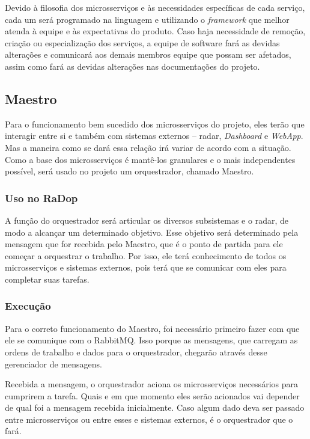 Devido à filosofia dos microsserviços e às necessidades específicas de cada serviço, cada um será programado na linguagem e utilizando o \textit{framework} que melhor atenda à equipe e às expectativas do produto.
Caso haja necessidade de remoção, criação ou especialização dos serviços, a equipe de software fará as devidas alterações e comunicará aos demais membros equipe que possam ser afetados, assim como fará as devidas alterações nas documentações do projeto.

\subsection{Maestro}
Para o funcionamento bem sucedido dos microsserviços do projeto, eles terão que interagir entre si e também com sistemas externos -- radar, \textit{Dashboard} e \textit{WebApp}. Mas a maneira como se dará essa relação irá variar de acordo com a situação. Como a base dos microsserviços é mantê-los granulares e o mais independentes possível, será usado no projeto um orquestrador, chamado Maestro.

\subsubsection{Uso no RaDop}
A função do orquestrador será articular os diversos subsistemas e o radar, de modo a alcançar um determinado objetivo. Esse objetivo será determinado pela mensagem que for recebida pelo Maestro, que é o ponto de partida para ele começar a orquestrar o trabalho. Por isso, ele terá conhecimento de todos os microsserviços e sistemas externos, pois terá que se comunicar com eles para completar suas tarefas.

\subsubsection{Execução}
Para o correto funcionamento do Maestro, foi necessário primeiro fazer com que ele se comunique com o RabbitMQ. Isso porque as mensagens, que carregam as ordens de trabalho e dados para o orquestrador, chegarão através desse gerenciador de mensagens.

Recebida a mensagem, o orquestrador aciona os microsserviços necessários para cumprirem a tarefa. Quais e em que momento eles serão acionados vai depender de qual foi a mensagem recebida inicialmente. Caso algum dado deva ser passado entre microsserviços ou entre esses e sistemas externos, é o orquestrador que o fará.

